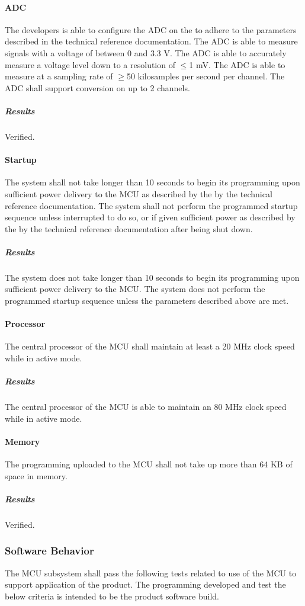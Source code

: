 \paragraph{ADC} The developers is able to configure the ADC on the to adhere to the parameters described in the technical reference documentation.
The ADC is able to measure signals with a voltage of between 0 and 3.3 V.
The ADC is able to accurately measure a voltage level down to a
resolution of $\leq$1 mV. The ADC is able to measure at a sampling rate
of $\geq$50 kilosamples per second per channel. The ADC shall support
conversion on up to 2 channels. 
\subparagraph{Results} Verified.

\paragraph{Startup} The system shall not take longer than 10 seconds to begin
its programming upon sufficient power delivery to the MCU as described by
the by the technical reference documentation. The system shall not perform
the programmed startup sequence unless interrupted to do so, or if given
sufficient power as described by the by the technical reference documentation
after being shut down.
\subparagraph{Results} The system does not take longer than 10 seconds to begin
its programming upon sufficient power delivery to the MCU. The system does not perform
the programmed startup sequence unless the parameters described above are met.

\paragraph{Processor} The central processor of the MCU shall maintain at
least a 20 MHz clock speed while in active mode.
\subparagraph{Results} The central processor of the MCU is able to maintain an 80 MHz clock speed while in active mode.

\paragraph{Memory} The programming uploaded to the MCU shall not take up
more than 64 KB of space in memory.
\subparagraph{Results} Verified.

\subsubsection{Software Behavior} The MCU subsystem shall pass the following
tests related to use of the MCU to support application of the product. The
programming developed and test the below criteria is intended to be the
product software build.

